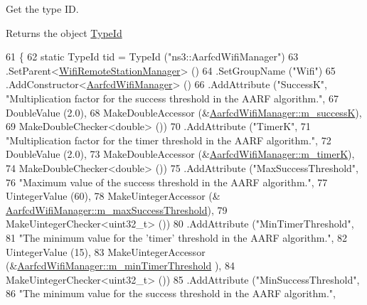 Get the type ID. 

\begin{DoxyReturn}{Returns}
the object \hyperlink{classns3_1_1TypeId}{Type\+Id} 
\end{DoxyReturn}

\begin{DoxyCode}
61 \{
62   \textcolor{keyword}{static} TypeId tid = TypeId (\textcolor{stringliteral}{"ns3::AarfcdWifiManager"})
63     .SetParent<\hyperlink{classns3_1_1WifiRemoteStationManager_a78524840f5900e1937e8e2d6df48954d}{WifiRemoteStationManager}> ()
64     .SetGroupName (\textcolor{stringliteral}{"Wifi"})
65     .AddConstructor<\hyperlink{classns3_1_1AarfcdWifiManager_a2af8a96ab6ea9ee36beff236c71e346f}{AarfcdWifiManager}> ()
66     .AddAttribute (\textcolor{stringliteral}{"SuccessK"}, \textcolor{stringliteral}{"Multiplication factor for the success threshold in the AARF algorithm."},
67                    DoubleValue (2.0),
68                    MakeDoubleAccessor (&\hyperlink{classns3_1_1AarfcdWifiManager_a6f0c73ae231af0375391ab04e63cf0b2}{AarfcdWifiManager::m\_successK}),
69                    MakeDoubleChecker<double> ())
70     .AddAttribute (\textcolor{stringliteral}{"TimerK"},
71                    \textcolor{stringliteral}{"Multiplication factor for the timer threshold in the AARF algorithm."},
72                    DoubleValue (2.0),
73                    MakeDoubleAccessor (&\hyperlink{classns3_1_1AarfcdWifiManager_a0f41cac60afd7763f1dba44288e87db9}{AarfcdWifiManager::m\_timerK}),
74                    MakeDoubleChecker<double> ())
75     .AddAttribute (\textcolor{stringliteral}{"MaxSuccessThreshold"},
76                    \textcolor{stringliteral}{"Maximum value of the success threshold in the AARF algorithm."},
77                    UintegerValue (60),
78                    MakeUintegerAccessor (&
      \hyperlink{classns3_1_1AarfcdWifiManager_a2356178ccd0f0666b94437e1adb33064}{AarfcdWifiManager::m\_maxSuccessThreshold}),
79                    MakeUintegerChecker<uint32\_t> ())
80     .AddAttribute (\textcolor{stringliteral}{"MinTimerThreshold"},
81                    \textcolor{stringliteral}{"The minimum value for the 'timer' threshold in the AARF algorithm."},
82                    UintegerValue (15),
83                    MakeUintegerAccessor (&\hyperlink{classns3_1_1AarfcdWifiManager_a568403d4a1545d115fa70a262af60c66}{AarfcdWifiManager::m\_minTimerThreshold}
      ),
84                    MakeUintegerChecker<uint32\_t> ())
85     .AddAttribute (\textcolor{stringliteral}{"MinSuccessThreshold"},
86                    \textcolor{stringliteral}{"The minimum value for the success threshold in the AARF algorithm."},

\end{DoxyCode}
